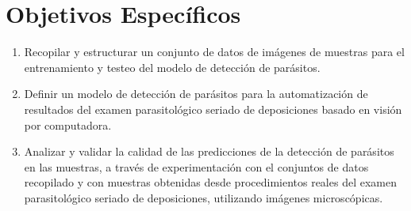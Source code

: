 \documentclass[letter,12pt]{report}
\begin{document}
\section{Objetivos Específicos}
\begin{enumerate}\justifying
    \item Recopilar y estructurar un conjunto de datos de imágenes de muestras para el entrenamiento y testeo del modelo de detección de parásitos.
    \item Definir un modelo de detección de parásitos para la automatización de resultados del examen parasitológico seriado de deposiciones basado en visión por computadora.
    \item Analizar y validar la calidad de las predicciones de la detección de parásitos en
        las muestras, a través de experimentación con el conjuntos de datos recopilado y
        con muestras obtenidas desde procedimientos reales del examen parasitológico
        seriado de deposiciones, utilizando imágenes microscópicas.
\end{enumerate}

%
\end{document}
